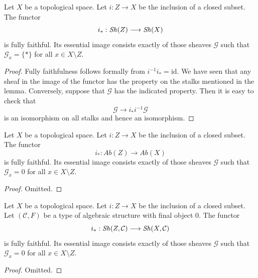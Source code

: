 \begin{lemma}
\label{lemma-equivalence-categories-closed}
Let $X$ be a topological space.
Let $i : Z \to X$ be the inclusion of a closed subset.
The functor
$$
i_* : \mathop{\mathit{Sh}}\nolimits(Z) \longrightarrow \mathop{\mathit{Sh}}\nolimits(X)
$$
is fully faithful. Its essential image consists exactly
of those sheaves $\mathcal{G}$ such that
$\mathcal{G}_x = \{*\}$ for all $x \in X \setminus Z$.
\end{lemma}

\begin{proof}
Fully faithfulness follows formally from $i^{-1} i_* = \text{id}$.
We have seen that any sheaf in the image of the functor has
the property on the stalks mentioned in the lemma. Conversely, suppose
that $\mathcal{G}$ has the indicated property.
Then it is easy to check that
$$
\mathcal{G} \to i_* i^{-1} \mathcal{G}
$$
is an isomorphism on all stalks and hence an isomorphism.
\end{proof}

\begin{lemma}
\label{lemma-equivalence-categories-closed-abelian}
Let $X$ be a topological space.
Let $i : Z \to X$ be the inclusion of a closed subset.
The functor
$$
i_* : \textit{Ab}(Z) \longrightarrow \textit{Ab}(X)
$$
is fully faithful. Its essential image consists exactly
of those sheaves $\mathcal{G}$ such that
$\mathcal{G}_x = 0$ for all $x \in X \setminus Z$.
\end{lemma}

\begin{proof}
Omitted.
\end{proof}

\begin{lemma}
\label{lemma-equivalence-categories-closed-structures}
Let $X$ be a topological space.
Let $i : Z \to X$ be the inclusion of a closed subset.
Let $(\mathcal{C}, F)$ be a type of algebraic structure
with final object $0$. The functor
$$
i_* : \mathop{\mathit{Sh}}\nolimits(Z, \mathcal{C}) \longrightarrow \mathop{\mathit{Sh}}\nolimits(X, \mathcal{C})
$$
is fully faithful. Its essential image consists exactly
of those sheaves $\mathcal{G}$ such that
$\mathcal{G}_x = 0$ for all $x \in X \setminus Z$.
\end{lemma}

\begin{proof}
Omitted.
\end{proof}

